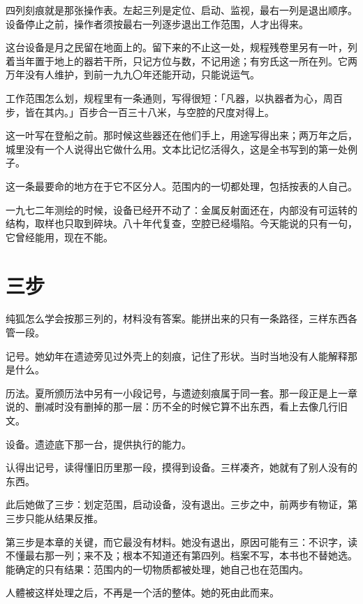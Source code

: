 四列刻痕就是那张操作表。左起三列是定位、启动、监视，最右一列是退出顺序。设备停止之前，操作者须按最右一列逐步退出工作范围，人才出得来。

这台设备是月之民留在地面上的。留下来的不止这一处，规程残卷里另有一叶，列着当年置于地上的器若干所，只记方位与数，不记用途；有穷氏这一所在列。它两万年没有人维护，到前一九九〇年还能开动，只能说运气。

工作范围怎么划，规程里有一条通则，写得很短：「凡器，以执器者为心，周百步，皆在其内。」百步合一百三十八米，与空腔的尺度对得上。

这一叶写在登船之前。那时候这些器还在他们手上，用途写得出来；两万年之后，城里没有一个人说得出它做什么用。文本比记忆活得久，这是全书写到的第一处例子。

这一条最要命的地方在于它不区分人。范围内的一切都处理，包括按表的人自己。

一九七二年测绘的时候，设备已经开不动了：金属反射面还在，内部没有可运转的结构，取样也只取到碎块。八十年代复查，空腔已经塌陷。今天能说的只有一句，它曾经能用，现在不能。

\section{三步}

纯狐怎么学会按那三列的，材料没有答案。能拼出来的只有一条路径，三样东西各管一段。

记号。她幼年在遗迹旁见过外壳上的刻痕，记住了形状。当时当地没有人能解释那是什么。

历法。夏所颁历法中另有一小段记号，与遗迹刻痕属于同一套。那一段正是上一章说的、删减时没有删掉的那一层：历不全的时候它算不出东西，看上去像几行旧文。

设备。遗迹底下那一台，提供执行的能力。

认得出记号，读得懂旧历里那一段，摸得到设备。三样凑齐，她就有了别人没有的东西。

此后她做了三步：划定范围，启动设备，没有退出。三步之中，前两步有物证，第三步只能从结果反推。

第三步是本章的关键，而它最没有材料。她没有退出，原因可能有三：不识字，读不懂最右那一列；来不及；根本不知道还有第四列。档案不写，本书也不替她选。能确定的只有结果：范围内的一切物质都被处理，她自己也在范围内。

人體被这样处理之后，不再是一个活的整体。她的死由此而来。
